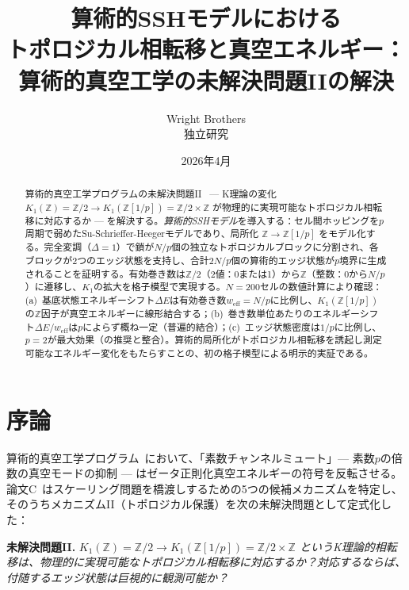 \documentclass[11pt,a4paper]{article}
\newcommand{\Zp}{\mathbb{Z}[1/p]}
\begin{document}
\title{算術的SSHモデルにおける\\トポロジカル相転移と真空エネルギー：\\算術的真空工学の未解決問題IIの解決}
\author{Wright Brothers\\{\small 独立研究}}
\date{2026年4月}
\maketitle

\begin{abstract}
算術的真空工学プログラムの未解決問題II~\cite{paper_C} --- K理論の変化 $K_1(\mathbb{Z}) = \mathbb{Z}/2 \to K_1(\Zp) = \mathbb{Z}/2 \times \mathbb{Z}$ が物理的に実現可能なトポロジカル相転移に対応するか --- を解決する。\emph{算術的SSHモデル}を導入する：セル間ホッピングを$p$周期で弱めたSu-Schrieffer-Heegerモデルであり、局所化 $\mathbb{Z} \to \Zp$ をモデル化する。完全変調（$\Delta = 1$）で鎖が$N/p$個の独立なトポロジカルブロックに分割され、各ブロックが2つのエッジ状態を支持し、合計$2N/p$個の算術的エッジ状態が$p$境界に生成されることを証明する。有効巻き数は$\mathbb{Z}/2$（2値：0または1）から$\mathbb{Z}$（整数：0から$N/p$）に遷移し、$K_1$の拡大を格子模型で実現する。$N=200$セルの数値計算により確認：(a)~基底状態エネルギーシフト$\Delta E$は有効巻き数$w_{\mathrm{eff}} = N/p$に比例し、$K_1(\Zp)$の$\mathbb{Z}$因子が真空エネルギーに線形結合する；(b)~巻き数単位あたりのエネルギーシフト$\Delta E/w_{\mathrm{eff}}$は$p$によらず概ね一定（普遍的結合）；(c)~エッジ状態密度は$1/p$に比例し、$p=2$が最大効果（\cite{paper_A}の推奨と整合）。算術的局所化がトポロジカル相転移を誘起し測定可能なエネルギー変化をもたらすことの、初の格子模型による明示的実証である。
\end{abstract}

\section{序論}

算術的真空工学プログラム~\cite{paper_A,paper_B,paper_C}において、「素数チャンネルミュート」--- 素数$p$の倍数の真空モードの抑制 --- はゼータ正則化真空エネルギーの符号を反転させる。論文C~\cite{paper_C}はスケーリング問題を橋渡しするための5つの候補メカニズムを特定し、そのうちメカニズムII（トポロジカル保護）を次の未解決問題として定式化した：

\textbf{未解決問題II.} \textit{$K_1(\mathbb{Z}) = \mathbb{Z}/2 \to K_1(\Zp) = \mathbb{Z}/2 \times \mathbb{Z}$ というK理論的相転移は、物理的に実現可能なトポロジカル相転移に対応するか？対応するならば、付随するエッジ状態は巨視的に観測可能か？}
\end{document}
